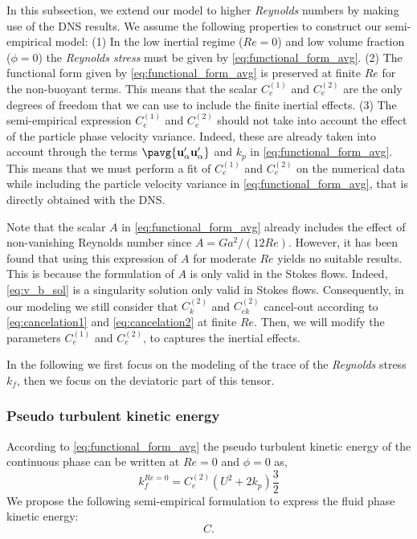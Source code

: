 In this subsection, we extend our model to higher \textit{Reynolds} numbers by making use of the DNS results. 
We assume the following properties to construct our semi-empirical model: 
(1) In the low inertial regime ($Re=0$) and low volume fraction ($\phi=0$) the \textit{Reynolds stress} must be given by  \ref{eq:functional_form_avg}. 
(2) The functional form given by \ref{eq:functional_form_avg} is preserved at finite $Re$ for the non-buoyant terms. 
This means that the scalar $C_e^{(1)}$ and $C_e^{(2)}$ are the only degrees of freedom that we can use to include the finite inertial effects. 
(3) The semi-empirical expression  $C_e^{(1)}$ and $C_e^{(2)}$ should not take into account the effect of the particle phase velocity variance. 
Indeed, these are already taken into account through the terms $\pavg{\textbf{u}_\alpha'\textbf{u}_\alpha'}$ and $k_p$ in \ref{eq:functional_form_avg}. 
This means that we must perform a fit of $C_e^{(1)}$ and $C_e^{(2)}$ on the numerical data while including the particle velocity variance in \ref{eq:functional_form_avg}, that is directly obtained with the DNS.

Note that the scalar $A$ in \ref{eq:functional_form_avg} already includes the effect of non-vanishing Reynolds number since $A = Ga^2 /(12 Re)$. 
However, it has been found that using this expression of $A$ for moderate $Re$ yields no suitable results. 
This is because the formulation of $A$ is only valid in the Stokes flows. 
Indeed, \ref{eq:v_b_sol} is a singularity solution only valid in Stokes flows. 
Consequently, in our modeling we still consider that $C_k^{(2)}$ and $C_{ek}^{(2)}$ cancel-out according to \ref{eq:cancelation1} and \ref{eq:cancelation2} at finite $Re$. 
Then, we will modify the parameters $C_e^{(1)}$ and $C_e^{(2)}$,  to captures the inertial effects. 

In the following we first focus on the modeling of the trace of the \textit{Reynolds} stress $k_f$, then we focus on the deviatoric part of this tensor. 

\subsubsection{Pseudo turbulent kinetic energy}

According to \ref{eq:functional_form_avg} the pseudo turbulent kinetic energy of the continuous phase can be written at $Re = 0$ and $\phi = 0$ as,
\begin{equation}
    k_f^{Re = 0}
    = 
    C_e^{(2)}  \left( U^2 + 2 k_p\right)  \frac{3}{2}
    \label{eq:TKE}
\end{equation}
We propose the following semi-empirical formulation to express the fluid phase kinetic energy: 
\begin{equation}
    C.
    \label{eq:semi_empirical}
\end{equation}


